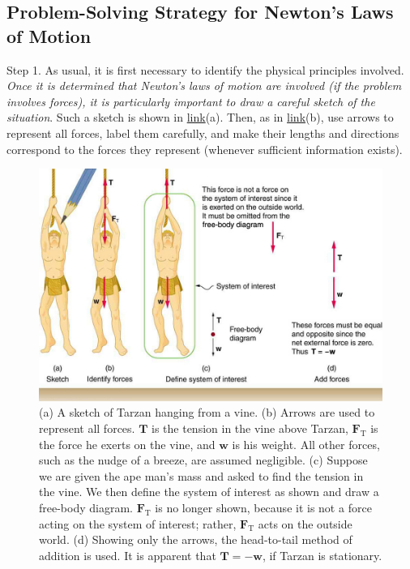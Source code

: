 \documentclass[
]{book}
\begin{document}
\hypertarget{import-auto-id2655652}{}
\hypertarget{problem-solving-strategy-for-newtons-laws-of-motion}{%
\subsection{Problem-Solving Strategy for Newton's Laws of Motion}\label{problem-solving-strategy-for-newtons-laws-of-motion}}

Step 1. As usual, it is first necessary to identify the physical
principles involved. \emph{Once it is determined that Newton's laws of motion
are involved (if the problem involves forces), it is particularly
important to draw a careful sketch of the situation}. Such a sketch is
shown in \protect\hyperlink{import-auto-id1669409}{link}(a).
Then, as in \protect\hyperlink{import-auto-id1669409}{link}(b),
use arrows to represent all forces, label them carefully, and make their
lengths and directions correspond to the forces they represent (whenever
sufficient information exists).

\begin{figure}
\hypertarget{import-auto-id1669409}{%
\centering
\includegraphics{images/Figure 04_06_01.jpg}
\caption{(a) A sketch of Tarzan hanging from a vine. (b) Arrows are used to
represent all forces. \(\textbf{T}{}\) is the tension in the vine above
Tarzan, \(\textbf{F}_{\text{T}}{}\) is the force he exerts on the vine,
and \(\textbf{w}{}\) is his weight. All other forces, such as the nudge of
a breeze, are assumed negligible. (c) Suppose we are given the ape man's
mass and asked to find the tension in the vine. We then define the
system of interest as shown and draw a free-body diagram.
\(\textbf{F}_{\text{T}}{}\) is no longer shown, because it is not a force
acting on the system of interest; rather, \(\textbf{F}_{\text{T}}{}\) acts
on the outside world. (d) Showing only the arrows, the head-to-tail
method of addition is used. It is apparent that
\({\textbf{T} = - \mathbf{w}}{}\), if Tarzan is
stationary.}\label{import-auto-id1669409}
}
\end{figure}
\end{document}
